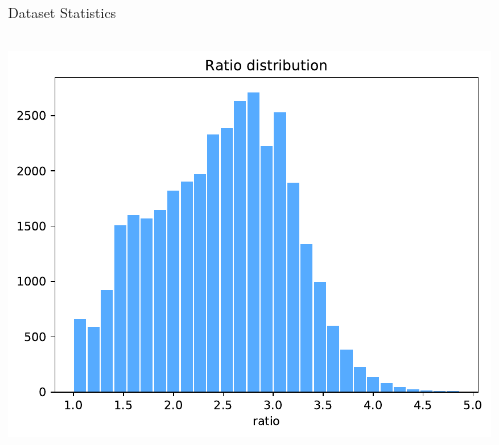 \documentclass[newPxFont,fullfooter,sectionpages, progressbar]{beamer}
\begin{document}
\begin{frame}{Dataset Statistics}

	\begin{columns}
		\begin{column}{.48\linewidth}
			\includegraphics[width=\textwidth]{images/ratio_hist.pdf}
		\end{column}

		\begin{column}{.48\linewidth}
		\end{column}
	\end{columns}
\end{frame}
\end{document}
